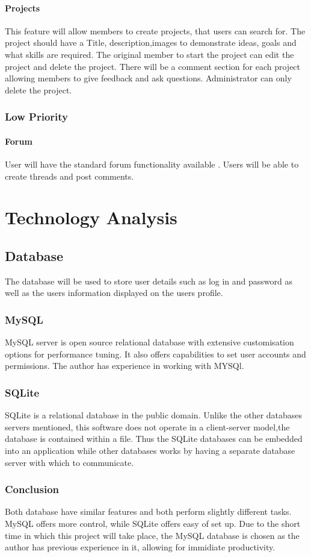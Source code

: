 \documentclass[a4paper,oneside,11pt]{report}
\begin{document}
\subsubsection{Projects}
This feature will allow members to create projects, that users can search for. The project should have a Title, description,images to demonstrate ideas, goals and what skills are required. The original member to start the project can edit the project and delete the project. There will be a comment section for each project allowing members to give feedback and ask questions. Administrator can only delete the project.
\subsection{Low Priority}
\subsubsection{Forum}
User will have the standard forum functionality available . Users will be able to create threads and post comments. 

\chapter{Technology Analysis}
\section{Database}
The database will be used to store user details such as log in and password as well as the users information displayed on the users profile.
\subsection{MySQL}
MySQL server is open source relational database with extensive customisation options for performance tuning. It also offers capabilities to set user accounts and permissions. The author has experience in working with MYSQl.
\subsection{SQLite}
SQLite is a relational database in the public domain. Unlike the other databases servers mentioned, this software does not operate in a client-server model,the database is contained within a file. Thus the SQLite databases can be embedded into an application while other databases works by having a separate database server with which to communicate.
\subsection{Conclusion}
Both database have similar features and both perform slightly different tasks. MySQL offers more control, while SQLite offers easy of set up. Due to the short time in which this project will take place, the MySQL database is chosen as the author has previous experience in it, allowing for immidiate productivity.
\end{document}

